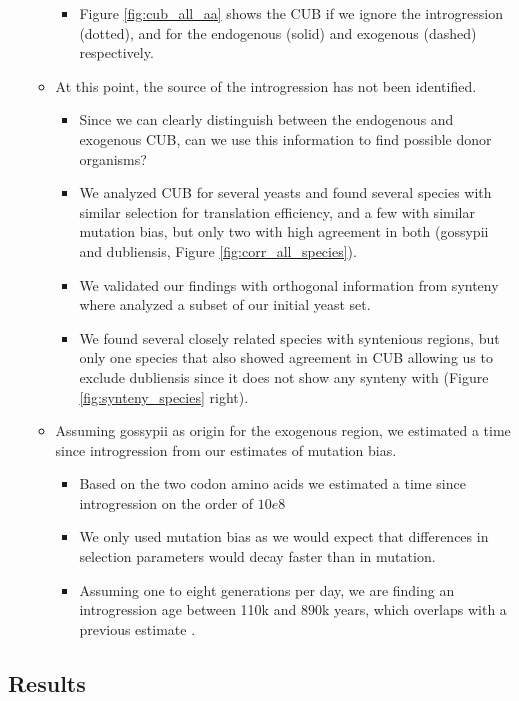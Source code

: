 \documentclass[12pt]{article}
\begin{document}
\begin{itemize}
\begin{itemize}
\begin{itemize}
			\item Figure \ref{fig:cub_all_aa} shows the CUB if we ignore the introgression (dotted), and for the endogenous (solid) and exogenous (dashed) respectively.
		\end{itemize}
		\item At this point, the source of the introgression has not been identified.
		\begin{itemize}
			\item Since we can clearly distinguish between the endogenous and exogenous CUB, can we use this information to find possible donor organisms?
			\item We analyzed CUB for several yeasts and found several species with similar selection for translation efficiency, and a few with similar mutation bias, but only two with high agreement in both (gossypii and dubliensis, Figure \ref{fig:corr_all_species}).
			\item We validated our findings with orthogonal information from synteny where analyzed a subset of our initial yeast set.
			\item We found several closely related species with syntenious regions, but only one species that also showed agreement in CUB allowing us to exclude dubliensis since it does not show any synteny with \kluyveri (Figure \ref{fig:synteny_species} right).
		\end{itemize}
		\item Assuming gossypii as origin for the exogenous region, we estimated a time since introgression from our estimates of mutation bias.
		\begin{itemize}
			\item Based on the two codon amino acids we estimated a time since introgression on the order of $10e8$
			\item We only used mutation bias as we would expect that differences in selection parameters would decay faster than in mutation.
			\item Assuming one to eight generations per day, we are finding an introgression age between 110k and 890k years, which overlaps with a previous estimate \citep{friedrich2015}.
		\end{itemize}
	\end{itemize}
\end{itemize}

\subsection*{Results}
\end{document}
